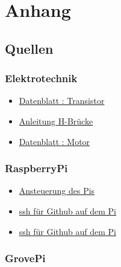 \documentclass[notitlepage]{report}
\begin{document}
\chapter{Anhang}


\section{Quellen}

\subsection{Elektrotechnik}
\begin{itemize}

\item \href{http://cdn-reichelt.de/documents/datenblatt/A100/BC546_48-CDIL.pdf}{Datenblatt : Transistor}


\item \href{http://anleitung.joy-it.net/wp-content/uploads/2017/06/SBC-MotoDriver2-Anleitung.pdf}{Anleitung H-Brücke}

\item \href{http://cdn-reichelt.de/documents/datenblatt/A300/COM_MOTOR_RAD_DB-DE.pdf}{Datenblatt : Motor}

\end{itemize}

\subsection{RaspberryPi}

\begin{itemize}

\item \href{http://www.netzmafia.de/skripten/hardware/RasPi/RasPi_GPIO_C.html}{Ansteuerung des Pis}

\item \href{https://help.github.com/enterprise/2.14/user/articles/generating-a-new-ssh-key-and-adding-it-to-the-ssh-agent/}{ssh für Github auf dem Pi}

\item \href{https://devmarketer.io/learn/set-ssh-key-github/}{ssh für Github auf dem Pi}

\end{itemize}

\subsection{GrovePi}
\end{document}
